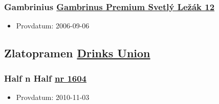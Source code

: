 \documentclass[11pt]{article}
\begin{document}
\subsubsection{Gambrinius \underline{Gambrinus Premium Svetlý Ležák 12}}
\label{sec:orgd342731}
\begin{itemize}
\item Provdatum: 2006-09-06
\end{itemize}
\subsection{Zlatopramen \underline{Drinks Union}}
\label{sec:org0957c95}
\subsubsection{Half n Half \underline{nr 1604}}
\label{sec:orgd7d01de}
\begin{itemize}
\item Provdatum: 2010-11-03
\end{itemize}
\end{document}
